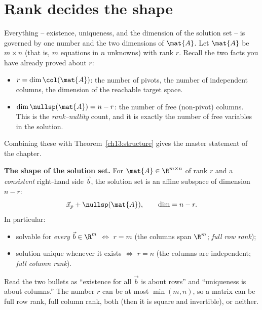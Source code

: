 \section{Rank decides the shape}

Everything -- existence, uniqueness, and the dimension of the solution set -- is governed
by one number and the two dimensions of $\mat{A}$. Let $\mat{A}$ be $m\times n$ (that is,
$m$ equations in $n$ unknowns) with rank $r$. Recall the two facts you have already proved
about $r$:

\begin{itemize}
  \item $r=\dim\col(\mat{A})$: the number of pivots, the number of independent columns,
    the dimension of the reachable target space.
  \item $\dim\nullsp(\mat{A})=n-r$: the number of free (non-pivot) columns. This is the
    \emph{rank--nullity} count, and it is exactly the number of free variables in the
    solution.
\end{itemize}

Combining these with Theorem~\ref{ch13:structure} gives the master statement of the
chapter.

\begin{formalbox}
\textbf{The shape of the solution set.} For $\mat{A}\in\R^{m\times n}$ of rank $r$ and a
\emph{consistent} right-hand side $\vec{b}$, the solution set is an affine subspace of
dimension $n-r$:
\[
  \vec{x}_p+\nullsp(\mat{A}),\qquad \dim=n-r.
\]
In particular:
\begin{itemize}
  \item solvable for \emph{every} $\vec{b}\in\R^m$ $\iff$ $r=m$ (the columns span $\R^m$;
    \emph{full row rank});
  \item solution unique whenever it exists $\iff$ $r=n$ (the columns are independent;
    \emph{full column rank}).
\end{itemize}
\end{formalbox}

Read the two bullets as ``existence for all $\vec b$ is about rows'' and ``uniqueness is
about columns.'' The number $r$ can be at most $\min(m,n)$, so a matrix can be full row
rank, full column rank, both (then it is square and invertible), or neither.

